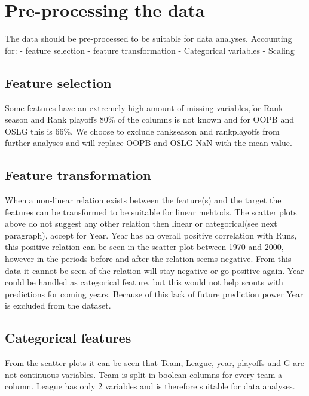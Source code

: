 \documentclass[11pt]{article}
\begin{document}
    \section{Pre-processing the data}\label{pre-processing-the-data}

The data should be pre-processed to be suitable for data analyses.
Accounting for: - feature selection - feature transformation -
Categorical variables - Scaling

\subsection{Feature selection}\label{feature-selection}

Some features have an extremely high amount of missing variables,for
Rank season and Rank playoffs 80\% of the columns is not known and for
OOPB and OSLG this is 66\%. We choose to exclude rankseason and
rankplayoffs from further analyses and will replace OOPB and OSLG NaN
with the mean value.

\subsection{Feature transformation}\label{feature-transformation}

When a non-linear relation exists between the feature(s) and the target
the features can be transformed to be suitable for linear mehtods. The
scatter plots above do not suggest any other relation then linear or
categorical(see next paragraph), accept for Year. Year has an overall
positive correlation with Runs, this positive relation can be seen in
the scatter plot between 1970 and 2000, however in the periods before
and after the relation seems negative. From this data it cannot be seen
of the relation will stay negative or go positive again. Year could be
handled as categorical feature, but this would not help scouts with
predictions for coming years. Because of this lack of future prediction
power Year is excluded from the dataset.

\subsection{Categorical features}\label{categorical-features}

From the scatter plots it can be seen that Team, League, year, playoffs
and G are not continuous variables. Team is split in boolean columns for
every team a column. League has only 2 variables and is therefore
suitable for data analyses.
\end{document}
